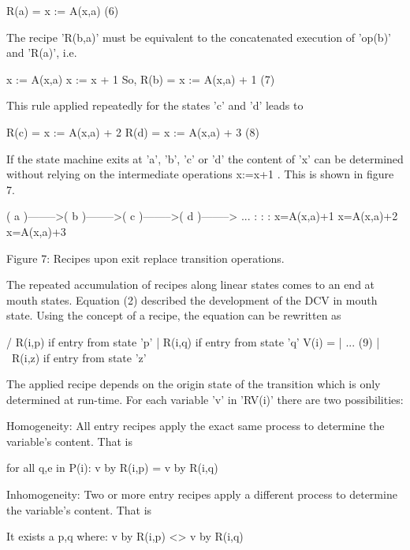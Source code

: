 \documentclass[12pt]{article}
\begin{document}
               R(a) = { x := A(x,a) }                                     (6)

The recipe 'R(b,a)' must be equivalent to the concatenated execution of 'op(b)'
and 'R(a)', i.e.

                   { x := A(x,a) }
                   { x := x + 1 }
So, 
               R(b) = { x := A(x,a) + 1 }                                 (7)

This rule applied repeatedly for the states 'c' and 'd' leads to

               R(c) = { x := A(x,a) + 2 }
               R(d) = { x := A(x,a) + 3 }                                 (8)

If the state machine exits at 'a', 'b', 'c' or 'd' the content of 'x' can be
determined without relying on the intermediate operations { x:=x+1 }. This
is shown in figure 7.
 
          ( a )-------->( b )-------->( c )-------->( d )--------> ...
                          :             :             :
                        x=A(x,a)+1    x=A(x,a)+2    x=A(x,a)+3


          Figure 7: Recipes upon exit replace transition operations.

The repeated accumulation of recipes along linear states comes to an end at
mouth states.  Equation (2) described the development of the DCV in mouth
state. Using the concept of a recipe, the equation can be rewritten as

                     /  R(i,p)  if entry from state 'p'
                     |  R(i,q)  if entry from state 'q'
            V(i) = |   ...                                                (9)
                     |  
                     \  R(i,z)  if entry from state 'z'

The applied recipe depends on the origin state of the transition which is only
determined at run-time.  For each variable 'v' in 'RV(i)' there are two
possibilities:

   Homogeneity:   All entry recipes apply the exact same process to
                  determine the variable's content. That is

                  for all q,e in P(i): v by R(i,p) = v by R(i,q) 

   Inhomogeneity: Two or more entry recipes apply a different process
                  to determine the variable's content. That is

                  It exists a p,q where: v by R(i,p) <> v by R(i,q) 
\end{document}
